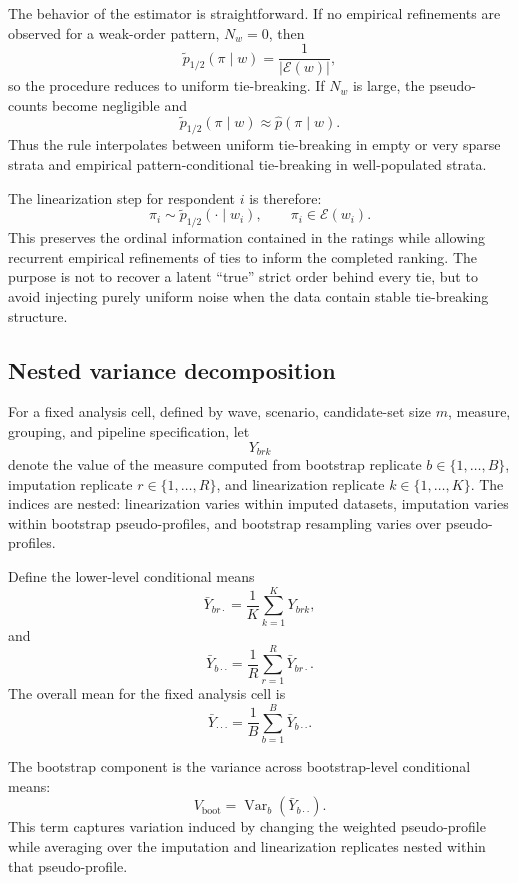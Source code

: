 \documentclass[12pt]{article}
\begin{document}
The behavior of the estimator is straightforward. If no empirical refinements
are observed for a weak-order pattern, \(N_w=0\), then
\[
\widetilde p_{1/2}(\pi\mid w)
=
\frac{1}{|\mathcal E(w)|},
\]
so the procedure reduces to uniform tie-breaking. If \(N_w\) is large, the
pseudo-counts become negligible and
\[
\widetilde p_{1/2}(\pi\mid w)
\approx
\widehat p(\pi\mid w).
\]
Thus the rule interpolates between uniform tie-breaking in empty or very sparse
strata and empirical pattern-conditional tie-breaking in well-populated strata.

The linearization step for respondent \(i\) is therefore:
\[
\pi_i \sim \widetilde p_{1/2}(\cdot\mid w_i),
\qquad
\pi_i\in\mathcal E(w_i).
\]
This preserves the ordinal information contained in the ratings while allowing
recurrent empirical refinements of ties to inform the completed ranking. The
purpose is not to recover a latent ``true'' strict order behind every tie, but
to avoid injecting purely uniform noise when the data contain stable
tie-breaking structure.

\subsection{Nested variance decomposition}
\label{app:nested-variance-decomposition}

For a fixed analysis cell, defined by wave, scenario, candidate-set size
\(m\), measure, grouping, and pipeline specification, let
\[
Y_{brk}
\]
denote the value of the measure computed from bootstrap replicate
\(b\in\{1,\ldots,B\}\), imputation replicate \(r\in\{1,\ldots,R\}\), and
linearization replicate \(k\in\{1,\ldots,K\}\). The indices are nested:
linearization varies within imputed datasets, imputation varies within
bootstrap pseudo-profiles, and bootstrap resampling varies over pseudo-profiles.

Define the lower-level conditional means
\[
\bar Y_{br\cdot}
=
\frac{1}{K}\sum_{k=1}^K Y_{brk},
\]
and
\[
\bar Y_{b\cdot\cdot}
=
\frac{1}{R}\sum_{r=1}^R \bar Y_{br\cdot}.
\]
The overall mean for the fixed analysis cell is
\[
\bar Y_{\cdot\cdot\cdot}
=
\frac{1}{B}\sum_{b=1}^B \bar Y_{b\cdot\cdot}.
\]

The bootstrap component is the variance across bootstrap-level conditional
means:
\[
V_{\mathrm{boot}}
=
\operatorname{Var}_b(\bar Y_{b\cdot\cdot}).
\]
This term captures variation induced by changing the weighted pseudo-profile
while averaging over the imputation and linearization replicates nested within
that pseudo-profile.
\end{document}

